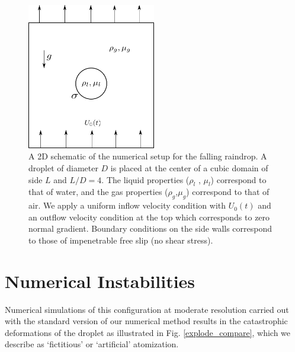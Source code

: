 \begin{figure}[h!]
\begin{center}
\includegraphics[width=0.5\textwidth]{plots/raindrop/setup.png}
\end{center}
\caption{A 2D schematic of the numerical setup for the falling raindrop. 
	A droplet of diameter $D$ is placed at the center of a cubic domain 
	of side $L$ and $L/D = 4$. The liquid properties ($\rho_l$ , $\mu_l$) 
	correspond to that of water, and the gas properties ($\rho_g$,$\mu_g$) 
	correspond to that of air. We apply a uniform inflow velocity condition 
	with $U_0(t)$ and an outflow velocity condition at the top which 
	corresponds to zero normal gradient.
	Boundary conditions on the side walls correspond 
	to those of impenetrable free slip (no shear stress).}
\label{setup}
\end{figure}

\section{Numerical Instabilities}

Numerical simulations of this configuration at moderate resolution 
carried out with the standard version
of our numerical method results in the catastrophic 
deformations of the droplet as illustrated in Fig. \ref{explode_compare}, 
which we describe as `fictitious' or `artificial' atomization. 

